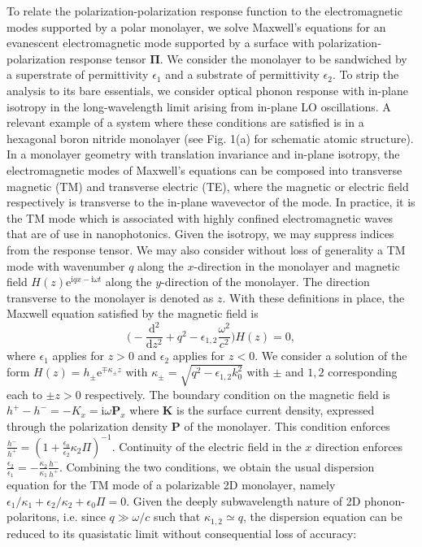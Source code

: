 \documentclass[aps,prb,twocolumn,
	           groupedaddress,superscriptaddress,
               amsfonts,amssymb,amsmath,floatfix,
	           citeautoscript]{revtex4-1}
\makeatletter
\newcommand{\iu}{\mathrm{i}}
\newcommand{\e}{\mathrm{e}}
\newcommand{\dd}{\mathrm{d}}
\newcommand{\ie}{i.e.\@\xspace} %
\makeatother
\begin{document}
To relate the polarization-polarization response function to the electromagnetic modes supported by a polar monolayer, we solve Maxwell's equations for an evanescent electromagnetic mode supported by a surface with polarization-polarization response tensor $\mathbf{\Pi}$. We consider the monolayer to be sandwiched by a superstrate of permittivity $\epsilon_1$ and a substrate of permittivity $\epsilon_2$. To strip the analysis to its bare essentials, we consider optical phonon response with in-plane isotropy in the long-wavelength limit arising from in-plane LO oscillations. A relevant example of a system where these conditions are satisfied is in a hexagonal boron nitride monolayer (see Fig. 1(a) for schematic atomic structure). In a monolayer geometry with translation invariance and in-plane isotropy, the electromagnetic modes of Maxwell's equations can be composed into transverse magnetic (TM) and transverse electric (TE), where the magnetic or electric field respectively is transverse to the in-plane wavevector of the mode. In practice, it is the TM mode which is associated with highly confined electromagnetic waves that are of use in nanophotonics.  Given the isotropy, we may suppress indices from the response tensor. We may also consider without loss of generality a TM mode with wavenumber $q$ along the $x$-direction in the monolayer and magnetic field $H(z)\e^{\iu qx-\iu\omega t}$ along the $y$-direction of the monolayer. The direction transverse to the monolayer is denoted as $z$.  With these definitions in place, the Maxwell equation satisfied by the magnetic field is 
\begin{equation}\label{eq:2dmaxwell}
    \bigg(-\frac{\dd^2}{\dd{}z^2}+q^2-\epsilon_{1,2}\frac{\omega^2}{c^2} \bigg)H(z) = 0,
\end{equation}
where $\epsilon_1$ applies for $z>0$ and $\epsilon_2$ applies for $z<0$. We consider a solution of the form $H(z) = h_\pm\e^{\mp\kappa_\pm z}$ with $\kappa_\pm = \sqrt{q^2-\epsilon_{1,2} k_0^2}$ with $\pm$ and $1,2$ corresponding each to $\pm z > 0$ respectively.  The boundary condition on the magnetic field is $h^+-h^- = -K_x = \iu\omega\mathbf{P}_x$ where $\mathbf{K}$ is the surface current density, expressed through the polarization density $\mathbf{P}$ of the monolayer.  This condition enforces $\frac{h^-}{h^+} =(1+\frac{\epsilon_0}{\epsilon_2} \kappa_2\Pi)^{-1}$. 
Continuity of the electric field in the $x$ direction enforces $\frac{\epsilon_2}{\epsilon_1} = -\frac{\kappa_2}{\kappa_1}\frac{h^-}{h^+}$. 
Combining the two conditions, we obtain the usual dispersion equation for the TM mode of a polarizable 2D monolayer, namely $\epsilon_1/\kappa_1 + \epsilon_2/\kappa_2 +\epsilon_0\Pi=0$. Given the deeply subwavelength nature of 2D phonon-polaritons, \ie since $q\gg\omega/c$ such that $\kappa_{1,2}\simeq q$, the dispersion equation can be reduced to its quasistatic limit without consequential loss of accuracy:
\end{document}
